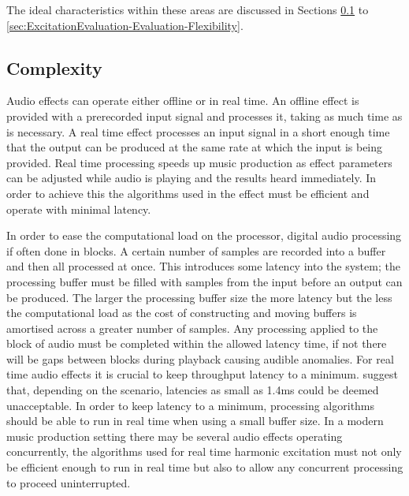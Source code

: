 	The ideal characteristics within these areas are discussed in Sections
	\ref{sec:ExcitationEvaluation-Evaluation-Complexity} to \ref{sec:ExcitationEvaluation-Evaluation-Flexibility}.

	\subsection{Complexity}
	\label{sec:ExcitationEvaluation-Evaluation-Complexity}
		Audio effects can operate either offline or in real time. An offline effect is provided with a prerecorded
		input signal and processes it, taking as much time as is necessary. A real time effect processes an input
		signal in a short enough time that the output can be produced at the same rate at which the input is being
		provided. Real time processing speeds up music production as effect parameters can be adjusted while audio
		is playing and the results heard immediately. In order to achieve this the algorithms used in the effect
		must be efficient and operate with minimal latency. 

		In order to ease the computational load on the processor, digital audio processing if often done in blocks.
		A certain number of samples are recorded into a buffer and then all processed at once. This introduces some
		latency into the system; the processing buffer must be filled with samples from the input before an output
		can be produced. The larger the processing buffer size the more latency but the less the computational load
		as the cost of constructing and moving buffers is amortised across a greater number of samples. Any
		processing applied to the block of audio must be completed within the allowed latency time, if not there
		will be gaps between blocks during playback causing audible anomalies. For real time audio effects it is
		crucial to keep throughput latency to a minimum. \citet{lester2007the} suggest that, depending on the
		scenario, latencies as small as 1.4ms could be deemed unacceptable. In order to keep latency to a minimum,
		processing algorithms should be able to run in real time when using a small buffer size. In a modern music
		production setting there may be several audio effects operating concurrently, the algorithms used for real
		time harmonic excitation must not only be efficient enough to run in real time but also to allow any
		concurrent processing to proceed uninterrupted.

